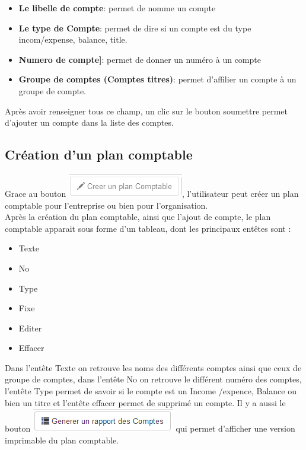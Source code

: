 \documentclass[12pt,a4paper]{report}
\begin{document}
\begin{itemize}
\item \textbf{Le libelle de compte}: permet de nomme un compte \\
\item \textbf{Le type de Compte}: permet de dire si un compte est du type incom/expense, balance, title.\\
\item \textbf{Numero de compte]}: permet de donner un numéro à un compte \\
\item \textbf{Groupe de comptes (Comptes titres)}: permet d'affilier un compte à un groupe de compte.\\
\end{itemize}

Après avoir renseigner tous ce champ, un clic sur le bouton soumettre permet d'ajouter un compte dans la liste des comptes.
 
\subsection{Création d'un plan comptable}
Grace au bouton \includegraphics[scale=0.7]{pic/CreePlanCompt.png}, l'utilisateur peut créer un plan comptable pour l'entreprise ou bien pour l'organisation. \\

Après la création du plan comptable, ainsi que l'ajout de compte, le plan comptable apparait sous forme d'un tableau, dont les principaux entêtes sont :
\begin{itemize}
\item Texte
\item No
\item Type
\item Fixe
\item Editer
\item Effacer
\end{itemize}

Dans l'entête Texte on retrouve les noms des différents comptes ainsi que ceux de groupe de comptes, dans l'entête No on retrouve le différent numéro des comptes, l'entête Type permet de savoir si le compte est un Income /expence, Balance ou bien un titre et l'entête effacer permet de supprimé un compte.  Il y a aussi le bouton \includegraphics[scale=0.7]{pic/GenereRapportCompt.png} qui permet d'afficher une version imprimable du plan comptable.
\end{document}
